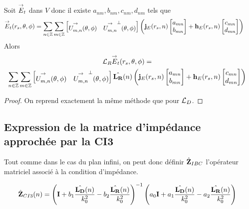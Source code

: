     \begin{prop}
      Soit \({\overset{\rightarrow}{E}}_t\) dans \(V\) donc il existe \(a_{nm},b_{nm},c_{nm},d_{nm}\) tels que
      \begin{align*}
      {\overset{\rightarrow}{E}}_t(r_s,\theta,\phi) &= \sum_{n\in\mathbb Z}\sum_{m\in\mathbb Z}
            \begin{bmatrix}
              {\overset{\rightarrow}{U_{m,n}^{{}}}}(\theta,\phi) & {\overset{\rightarrow}{U_{m,n}^{{}}}}^\perp(\theta,\phi)
            \end{bmatrix}
            \left(
              \mathbf{j}_E(r_s,n)
              \begin{bmatrix}
                  a_{mn}
                  \\
                  b_{mn}
              \end{bmatrix}
              +
              \mathbf{h}_E(r_s,n)
              \begin{bmatrix}
                  c_{mn}
                  \\
                  d_{mn}
              \end{bmatrix}
            \right)
      \end{align*}
      Alors
      \begin{multline*}
        {\mathcal{L}_R}{\overset{\rightarrow}{E}}_t(r_s,\theta,\phi) = 
        \\
         \sum_{n\in\mathbb Z}\sum_{m\in\mathbb Z}
            \begin{bmatrix}
              {\overset{\rightarrow}{U_{m,n}^{{}}}}(\theta,\phi) & {\overset{\rightarrow}{U_{m,n}^{{}}}}^\perp(\theta,\phi)
            \end{bmatrix}
            \hat{\mathbf{L_R}}(n)
            \left(
              \mathbf{j}_E(r_s,n)
              \begin{bmatrix}
                  a_{mn}
                  \\
                  b_{mn}
              \end{bmatrix}
              +
              \mathbf{h}_E(r_s,n)
              \begin{bmatrix}
                  c_{mn}
                  \\
                  d_{mn}
              \end{bmatrix}
            \right)
      \end{multline*}
    \end{prop}

    \begin{proof}
      On reprend exactement la même méthode que pour \({\mathcal{L}_D}\).
    \end{proof}

  \subsection{Expression de la matrice d'impédance approchée par la CI3}

    Tout comme dans le cas du plan infini, on peut donc définir \(\hat{\mathbf{Z}}_{IBC}\) l’opérateur matriciel associé à la condition d'impédance.

    \begin{align}
        \label{eq:sphere:hoibc:ci3}
        \hat{\mathbf{Z}}_{CI3}(n) = \left(\mathbf{I} + b_1 \dfrac{\hat{\mathbf{L_D}}(n)}{k_0^2} - b_2 \dfrac{\hat{\mathbf{L_R}}(n)}{k_0^2} \right)^{-1}
        \left(a_0 \mathbf{I} + a_1 \dfrac{\hat{\mathbf{L_D}}(n)}{k_0^2} - a_2 \dfrac{\hat{\mathbf{L_R}}(n)}{k_0^2}\right)
    \end{align}
